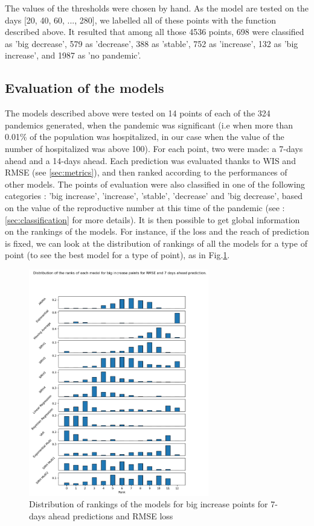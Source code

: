 The values of the thresholds were chosen by hand. 
As the model are tested on the days [20, 40, 60, ..., 280], we labelled all of these points with the function described above. 
It resulted that among all those 4536 points, 698 were classified as 'big decrease', 579 as 'decrease', 388 as 'stable', 752 as 'increase',  132 as 'big increase', and 1987 as 'no pandemic'.



\subsection{Evaluation of the models}

The models described above were tested on 14 points of each of the 324 pandemics generated, when the pandemic was significant (i.e when more than 0.01\% of the population was hospitalized, in our case when the value of the number of hospitalized was above 100). 
For each point, two  were made:  a 7-days ahead and a 14-days ahead. 
Each prediction was evaluated thanks to WIS and RMSE (see \ref{sec:metrics}), and then ranked according to the performances of other models.
The points of evaluation were also classified in one of the following categories : 'big increase', 'increase', 'stable', 'decrease' and 'big decrease', based on the value of the reproductive number at this time of the pandemic (see :\ref{sec:classification} for more details). 
It is then possible to get global information on the rankings of the models. 
For instance, if the loss and the reach of prediction is fixed, we can look at the distribution of rankings of all the models for a type of point (to see the best model for a type of point), as in Fig.\ref{fig:rankings}.
\begin{figure}[h]
    \centering
    \includegraphics[width=0.7\textwidth]{figures/ranks_big_increase_RMSE_7.png}
    \caption{Distribution of rankings of the models for big increase points for 7-days ahead predictions and RMSE loss}
    \label{fig:rankings}
\end{figure}

